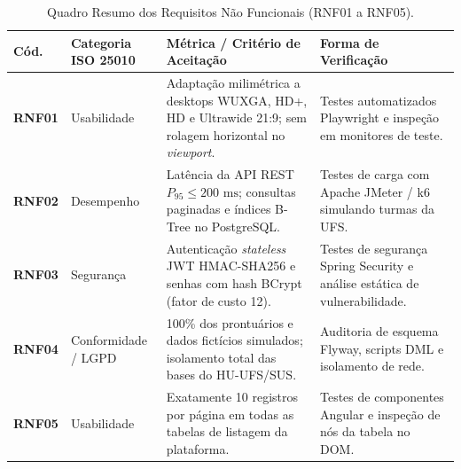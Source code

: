 \begin{table}[htb]
\centering
\small
\caption{Quadro Resumo dos Requisitos Não Funcionais (RNF01 a RNF05).}
\label{tab_rnf_consolidado_1}
\begin{tabularx}{\textwidth}{l >{\raggedright\arraybackslash}p{2.9cm} X >{\raggedright\arraybackslash}p{3.2cm}}
\toprule
\textbf{Cód.} & \textbf{Categoria ISO 25010} & \textbf{Métrica / Critério de Aceitação} & \textbf{Forma de Verificação} \\
\midrule
\textbf{RNF01} & Usabilidade & Adaptação milimétrica a desktops WUXGA, HD+, HD e Ultrawide 21:9; sem rolagem horizontal no \textit{viewport}. & Testes automatizados Playwright e inspeção em monitores de teste. \\
\midrule
\textbf{RNF02} & Desempenho & Latência da API REST $P_{95} \le 200\text{ ms}$; consultas paginadas e índices B-Tree no PostgreSQL. & Testes de carga com Apache JMeter / k6 simulando turmas da UFS. \\
\midrule
\textbf{RNF03} & Segurança & Autenticação \textit{stateless} JWT HMAC-SHA256 e senhas com hash BCrypt (fator de custo 12). & Testes de segurança Spring Security e análise estática de vulnerabilidade. \\
\midrule
\textbf{RNF04} & Conformidade / LGPD & 100\% dos prontuários e dados fictícios simulados; isolamento total das bases do HU-UFS/SUS. & Auditoria de esquema Flyway, scripts DML e isolamento de rede. \\
\midrule
\textbf{RNF05} & Usabilidade & Exatamente 10 registros por página em todas as tabelas de listagem da plataforma. & Testes de componentes Angular e inspeção de nós da tabela no DOM. \\
\bottomrule
\end{tabularx}
\end{table}

